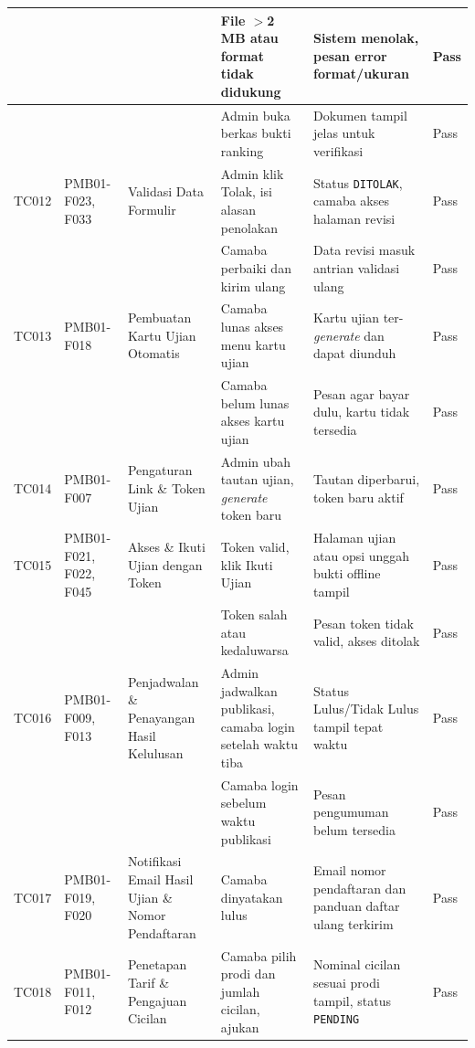 \begin{longtable}{|T{0.05\textwidth}|T{0.10\textwidth}|T{0.13\textwidth}|T{0.21\textwidth}|T{0.19\textwidth}|T{0.09\textwidth}|}
	\hline
	       &            &                    & File $>$2 MB atau format tidak didukung & Sistem menolak, pesan error format/ukuran & Pass \\
	\hline
	       &            &                    & Admin buka berkas bukti ranking & Dokumen tampil jelas untuk verifikasi & Pass \\
	\hline
	TC012 & PMB01-F023, F033 & Validasi Data Formulir & Admin klik Tolak, isi alasan penolakan & Status \texttt{DITOLAK}, camaba akses halaman revisi & Pass \\
	\hline
	       &            &                          & Camaba perbaiki dan kirim ulang & Data revisi masuk antrian validasi ulang & Pass \\
	\hline
	TC013 & PMB01-F018 & Pembuatan Kartu Ujian Otomatis & Camaba lunas akses menu kartu ujian & Kartu ujian ter-\textit{generate} dan dapat diunduh & Pass \\
	\hline
	       &            &                                & Camaba belum lunas akses kartu ujian & Pesan agar bayar dulu, kartu tidak tersedia & Pass \\
	\hline
	TC014 & PMB01-F007 & Pengaturan Link \& Token Ujian & Admin ubah tautan ujian, \textit{generate} token baru & Tautan diperbarui, token baru aktif & Pass \\
	\hline
	TC015 & PMB01-F021, F022, F045 & Akses \& Ikuti Ujian dengan Token & Token valid, klik Ikuti Ujian & Halaman ujian atau opsi unggah bukti offline tampil & Pass \\
	\hline
	       &            &                                 & Token salah atau kedaluwarsa & Pesan token tidak valid, akses ditolak & Pass \\
	\hline
	TC016 & PMB01-F009, F013 & Penjadwalan \& Penayangan Hasil Kelulusan & Admin jadwalkan publikasi, camaba login setelah waktu tiba & Status Lulus/Tidak Lulus tampil tepat waktu & Pass \\
	\hline
	       &            &                   & Camaba login sebelum waktu publikasi & Pesan pengumuman belum tersedia & Pass \\
	\hline
	TC017 & PMB01-F019, F020 & Notifikasi Email Hasil Ujian \& Nomor Pendaftaran & Camaba dinyatakan lulus & Email nomor pendaftaran dan panduan daftar ulang terkirim & Pass \\
	\hline
	TC018 & PMB01-F011, F012 & Penetapan Tarif \& Pengajuan Cicilan & Camaba pilih prodi dan jumlah cicilan, ajukan & Nominal cicilan sesuai prodi tampil, status \texttt{PENDING} & Pass \\

\end{longtable}

